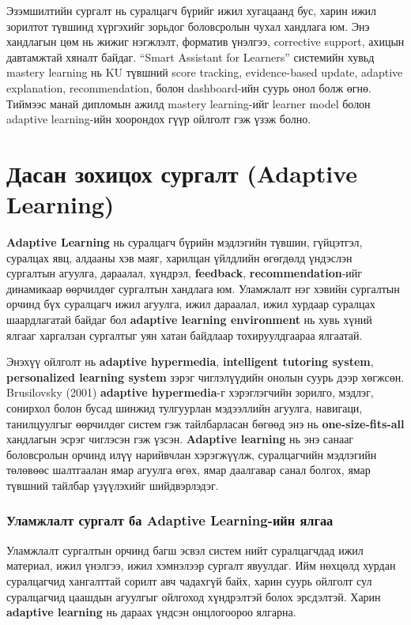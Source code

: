 \documentclass[12pt,A4]{report}
\begin{document}
Эзэмшилтийн сургалт нь суралцагч бүрийг ижил хугацаанд бус, харин ижил зорилтот түвшинд хүргэхийг зорьдог боловсролын чухал хандлага юм. Энэ хандлагын цөм нь жижиг нэгжлэлт, форматив үнэлгээ, corrective support, ахицын давтамжтай хяналт байдаг. ``Smart Assistant for Learners'' системийн хувьд mastery learning нь KU түвшний score tracking, evidence-based update, adaptive explanation, recommendation, болон dashboard-ийн суурь онол болж өгнө. Тиймээс манай дипломын ажилд mastery learning-ийг learner model болон adaptive learning-ийн хоорондох гүүр ойлголт гэж үзэж болно.

\section{Дасан зохицох сургалт (Adaptive Learning)}

\textbf{Adaptive Learning} нь суралцагч бүрийн мэдлэгийн түвшин, гүйцэтгэл, суралцах явц, алдааны хэв маяг, харилцан үйлдлийн өгөгдөлд үндэслэн сургалтын агуулга, дараалал, хүндрэл, \textbf{feedback}, \textbf{recommendation}-ийг динамикаар өөрчилдөг сургалтын хандлага юм. Уламжлалт нэг хэвийн сургалтын орчинд бүх суралцагч ижил агуулга, ижил дараалал, ижил хурдаар суралцах шаардлагатай байдаг бол \textbf{adaptive learning environment} нь хувь хүний ялгааг харгалзан сургалтыг уян хатан байдлаар тохируулдгаараа ялгаатай.

Энэхүү ойлголт нь \textbf{adaptive hypermedia}, \textbf{intelligent tutoring system}, \textbf{personalized learning system} зэрэг чиглэлүүдийн онолын суурь дээр хөгжсөн. Brusilovsky (2001) \textbf{adaptive hypermedia}-г хэрэглэгчийн зорилго, мэдлэг, сонирхол болон бусад шинжид тулгуурлан мэдээллийн агуулга, навигаци, танилцуулгыг өөрчилдөг систем гэж тайлбарласан бөгөөд энэ нь \textbf{one-size-fits-all} хандлагын эсрэг чиглэсэн гэж үзсэн. \textbf{Adaptive learning} нь энэ санааг боловсролын орчинд илүү нарийвчлан хэрэгжүүлж, суралцагчийн мэдлэгийн төлөвөөс шалтгаалан ямар агуулга өгөх, ямар даалгавар санал болгох, ямар түвшний тайлбар үзүүлэхийг шийдвэрлэдэг.

\subsubsection*{Уламжлалт сургалт ба Adaptive Learning-ийн ялгаа}

Уламжлалт сургалтын орчинд багш эсвэл систем нийт суралцагчдад ижил материал, ижил үнэлгээ, ижил хэмнэлээр сургалт явуулдаг. Ийм нөхцөлд хурдан суралцагчид хангалттай сорилт авч чадахгүй байх, харин суурь ойлголт сул суралцагчид цаашдын агуулгыг ойлгоход хүндрэлтэй болох эрсдэлтэй. Харин \textbf{adaptive learning} нь дараах үндсэн онцлогоороо ялгарна.
\end{document}

